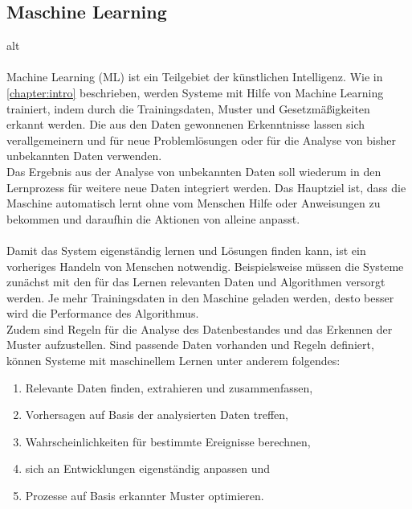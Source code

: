 \documentclass[12pt,oneside,a4paper,parskip]{scrbook}
\begin{document}
\subsection{Maschine Learning}
alt
\\\\
Machine Learning (ML) ist ein Teilgebiet der künstlichen Intelligenz. Wie in \ref{chapter:intro} beschrieben, werden Systeme mit Hilfe von Machine Learning trainiert, indem durch die Trainingsdaten, Muster und Gesetzmäßigkeiten erkannt werden. Die aus den Daten gewonnenen Erkenntnisse lassen sich verallgemeinern und für neue Problemlösungen oder für die Analyse von bisher unbekannten Daten verwenden.\\
Das Ergebnis aus der Analyse von unbekannten Daten soll wiederum in den Lernprozess für weitere neue Daten integriert werden. Das Hauptziel ist, dass die Maschine automatisch lernt ohne vom Menschen Hilfe oder Anweisungen zu bekommen und daraufhin die Aktionen von alleine anpasst\cite{EliminateHumanBias}.
\\\\
Damit das System eigenständig lernen und Lösungen finden kann, ist ein vorheriges Handeln von Menschen notwendig. Beispielsweise müssen die Systeme zunächst mit den für das Lernen relevanten Daten und Algorithmen versorgt werden.
Je mehr Trainingsdaten in den Maschine geladen werden, desto besser wird die Performance des Algorithmus.\\
Zudem sind Regeln für die Analyse des Datenbestandes und das Erkennen der Muster aufzustellen. Sind passende Daten vorhanden und Regeln definiert, können Systeme mit maschinellem Lernen unter anderem folgendes:

\begin{enumerate}
	\item Relevante Daten finden, extrahieren und zusammenfassen,
	\item Vorhersagen auf Basis der analysierten Daten treffen,
	\item Wahrscheinlichkeiten für bestimmte Ereignisse berechnen,
	\item sich an Entwicklungen eigenständig anpassen und
	\item Prozesse auf Basis erkannter Muster optimieren.
\end{enumerate}
\end{document}
